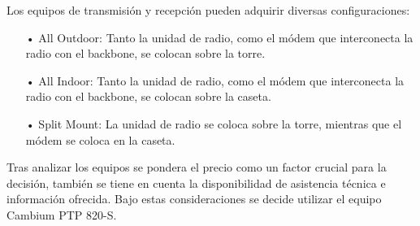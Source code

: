  
Los equipos de transmisión y recepción pueden adquirir diversas configuraciones:

\begin{enumerate}
\item[•]All Outdoor: Tanto la unidad de radio, como el módem que interconecta la radio con el backbone, se colocan sobre la torre.

\item[•]All Indoor: Tanto la unidad de radio, como el módem que interconecta la radio con el backbone, se colocan sobre la caseta.

\item[•]Split Mount: La unidad de radio se coloca sobre la torre, mientras que el módem se coloca en la caseta.
\end{enumerate}


Tras analizar los equipos se pondera el precio como un factor crucial para la decisión, también se tiene en cuenta la disponibilidad de asistencia técnica e información ofrecida. Bajo estas consideraciones se decide utilizar el equipo Cambium PTP 820-S.